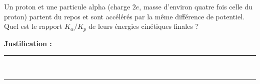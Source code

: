 Un proton et une particule alpha (charge $2e$, masse d'environ quatre fois celle du proton) partent du repos et sont accélérés par la même différence de potentiel. Quel est le rapport $K_\alpha / K_p$ de leurs énergies cinétiques finales ?

\choices

\noindent\textbf{Justification :} \hrulefill \\[2.5ex]
\rule{\linewidth}{0.4pt} \\[2.5ex]
\rule{\linewidth}{0.4pt}
\vfill

